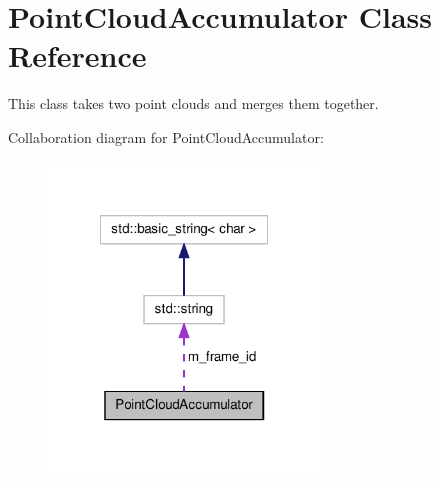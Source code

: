 \hypertarget{class_point_cloud_accumulator}{\section{\-Point\-Cloud\-Accumulator \-Class \-Reference}
\label{class_point_cloud_accumulator}
}


\-This class takes two point clouds and merges them together.  




\-Collaboration diagram for \-Point\-Cloud\-Accumulator\-:\nopagebreak
\begin{figure}[H]
\begin{center}
\leavevmode
\includegraphics[width=204pt]{class_point_cloud_accumulator__coll__graph}
\end{center}
\end{figure}
